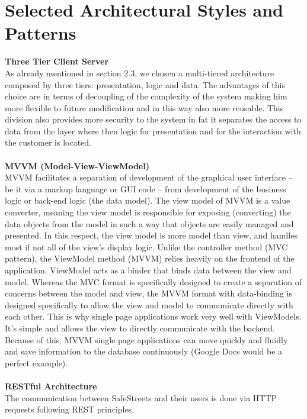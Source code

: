 \documentclass[../RASD.tex]{subfiles}
\begin{document}
    \section{Selected Architectural Styles and Patterns}\label{sec:selected-architectural-styles-and-patterns}
    \textbf{Three Tier Client Server} \\
    As already mentioned in section 2.3, we chosen a multi-tiered architecture composed by three tiers: presentation, logic and data.
    The advantages of this choice are in terms of decoupling of the complexity of the system making him more flexible to future modification
    and in this way also more reusable.
    This division also provides more security to the system in fat it separates the access to data from the layer where then logic for presentation
    and for the interaction with the customer is located.
    \\
    \\
    \textbf{MVVM (Model-View-ViewModel)} \\
    MVVM facilitates a separation of development of the graphical user interface – be it via a markup language or GUI code –
    from development of the business logic or back-end logic (the data model).
    The view model of MVVM is a value converter, meaning the view model is responsible for exposing (converting) the data objects from the model
    in such a way that objects are easily managed and presented.
    In this respect, the view model is more model than view, and handles most if not all of the view's display logic.
    Unlike the controller method (MVC pattern), the ViewModel method (MVVM) relies heavily on the frontend of the application.
    ViewModel acts as a binder that binds data between the view and model.
    Whereas the MVC format is specifically designed to create a separation of concerns between the model and view,
    the MVVM format with data-binding is designed specifically to allow the view and model to communicate directly with each other.
    This is why single page applications work very well with ViewModels.
    It’s simple and allows the view to directly communicate with the backend.
    Because of this, MVVM single page applications can move quickly and fluidly and save information to the database continuously
    (Google Docs would be a perfect example).
    \\
    \\
    \textbf{RESTful Architecture} \\
    The communication between SafeStreets and their users is done via HTTP requests following REST principles.
\end{document}
